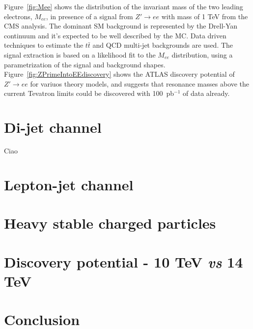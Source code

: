 \documentclass{cimento}
\begin{document}
Figure~\ref{fig:Mee} shows the distribution of the invariant mass 
of the two leading electrons, $M_{ee}$, in presence of 
a signal from $Z' \rightarrow ee$ with mass of 1 TeV from the CMS analysis. 
The dominant SM background is represented by the Drell-Yan 
continuum and it's expected to be well described by the MC.
Data driven techniques to estimate the $t\bar{t}$ and QCD multi-jet
backgrounds are used. The signal extraction is based on a likelihood 
fit to the $M_{ee}$ distribution, using a parametrization of the signal and 
background shapes. Figure~\ref{fig:ZPrimeIntoEEdiscovery}
shows the ATLAS discovery potential of $Z' \rightarrow ee$
for variuos theory models, and suggests that resonance masses 
above the current Tevatron limits could be discovered with 
100~pb$^{-1}$ of data already. 

\section{Di-jet channel} \label{dijet}
Ciao
 
\section{Lepton-jet channel} \label{leptonjet}

\section{Heavy stable charged particles} \label{HSCP}

\section{Discovery potential - 10 TeV {\it vs} 14 TeV} \label{10TeVvs14TeV}

\section{Conclusion} \label{Conclusion}












\end{document}
